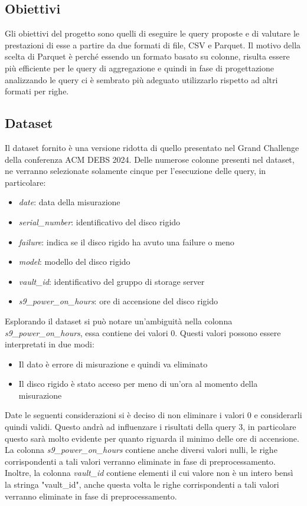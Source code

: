 \documentclass[conference]{IEEEtran}
\begin{document}
\subsection{Obiettivi}
Gli obiettivi del progetto sono quelli di eseguire le query proposte e di valutare le prestazioni di esse a partire da due formati di file, CSV e Parquet. Il motivo della scelta di Parquet è perché essendo un formato basato su colonne, risulta essere più efficiente per le query di aggregazione e quindi in fase di progettazione analizzando le query ci è sembrato più adeguato utilizzarlo rispetto ad altri formati per righe.

\subsection{Dataset}
Il dataset fornito è una versione ridotta di quello presentato nel Grand Challenge della conferenza ACM DEBS 2024. Delle numerose colonne presenti nel dataset, ne verranno selezionate solamente cinque per l'esecuzione delle query, in particolare:
\begin{itemize}
    \item \textit{date}: data della misurazione
    \item \textit{serial\_number}: identificativo del disco rigido
    \item \textit{failure}: indica se il disco rigido ha avuto una failure o meno
    \item \textit{model}: modello del disco rigido
    \item \textit{vault\_id}: identificativo del gruppo di storage server
    \item \textit{s9\_power\_on\_hours}: ore di accensione del disco rigido
\end{itemize}
Esplorando il dataset si può notare un'ambiguità nella colonna \textit{s9\_power\_on\_hours}, essa contiene dei valori 0. Questi valori possono essere interpretati in due modi:
\begin{itemize}
    \item Il dato è errore di misurazione e quindi va eliminato
    \item Il disco rigido è stato acceso per meno di un'ora al momento della misurazione
\end{itemize}
Date le seguenti considerazioni si è deciso di non eliminare i valori 0 e considerarli quindi validi. Questo andrà ad influenzare i risultati della query 3, in particolare questo sarà molto evidente per quanto riguarda il minimo delle ore di accensione.
La colonna \textit{s9\_power\_on\_hours} contiene anche diversi valori nulli, le righe corrispondenti a tali valori verranno eliminate in fase di preprocessamento.
Inoltre, la colonna \textit{vault\_id} contiene elementi il cui valore non è un intero bensì la stringa "vault\_id", anche questa volta le righe corrispondenti a tali valori verranno eliminate in fase di preprocessamento.
\end{document}
